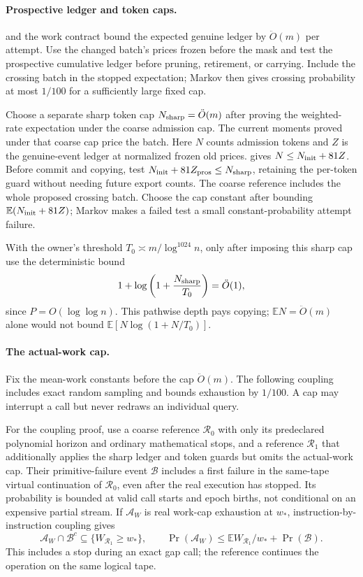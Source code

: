 \documentclass[11pt]{article}
\theoremstyle{remark}
\newcommand{\Ex}{\mathbb E}
\renewcommand{\O}{\ddot{O}}
\begin{document}
\paragraph{Prospective ledger and token caps.}
 and the work contract bound the expected genuine
ledger by $\O(m)$ per attempt.
Use the changed batch's prices frozen before the mask and test the prospective
cumulative ledger before pruning, retirement, or carrying.
Include the crossing batch in the stopped expectation; Markov then gives
crossing probability at most $1/100$ for a sufficiently large fixed cap.

Choose a separate sharp token cap $N_{\rm sharp}=\O(m)$ after
proving the weighted-rate expectation under the coarse admission cap.
The current moments proved under that coarse cap price the batch.
Here $N$ counts admission tokens and $Z$ is the genuine-event ledger at
normalized frozen old prices.
 gives $N\le N_{\rm init}+81Z$.
Before commit and copying, test $N_{\rm init}+81Z_{\rm pros}\le N_{\rm sharp}$,
retaining the per-token guard without needing future export counts.
The coarse reference includes the whole proposed crossing batch.
Choose the cap constant after bounding $\Ex(N_{\rm init}+81Z)$; Markov makes a
failed test a small constant-probability attempt failure.

With the owner's threshold $T_0\asymp m/\log^{1024} n$, only after imposing this
sharp cap use the deterministic bound
\[
 1+\log\left(1+\frac{N_{\rm sharp}}{T_0}\right)
          =\O(1),
\]
since $P=O(\log\log n)$.
This pathwise depth pays copying; $\Ex N=\O(m)$ alone would not bound
$\Ex[N\log(1+N/T_0)]$.

\paragraph{The actual-work cap.}
Fix the mean-work constants before the cap $\O(m)$.
The following coupling includes exact random sampling and bounds exhaustion by
$1/100$.
A cap may interrupt a call but never redraws an individual query.

For the coupling proof, use a coarse reference $\mathcal R_0$ with only its
predeclared polynomial horizon and ordinary mathematical stops, and a reference
$\mathcal R_1$ that additionally applies the sharp ledger and token guards but
omits the actual-work cap.
Their primitive-failure event $\mathcal B$ includes a first failure in the
same-tape virtual continuation of $\mathcal R_0$, even after the real execution
has stopped.
Its probability is bounded at valid call starts and epoch births, not
conditional on an expensive partial stream.
If $\mathcal A_W$ is real work-cap exhaustion at $w_*$,
instruction-by-instruction coupling gives
\[
 \mathcal A_W\cap\mathcal B^c
       \subseteq\{W_{\mathcal R_1}\ge w_*\},\qquad
 \Pr(\mathcal A_W)\le
       \Ex W_{\mathcal R_1}/w_*+\Pr(\mathcal B).
\]
This includes a stop during an exact gap call; the reference continues the
operation on the same logical tape.
\end{document}
